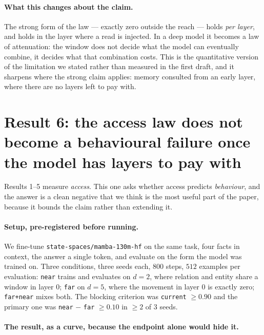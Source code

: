 \documentclass[11pt,a4paper]{article}
\begin{document}
\paragraph{What this changes about the claim.} The strong form of the law --- exactly zero outside
the reach --- holds \emph{per layer}, and holds in the layer where a read is injected. In a deep model
it becomes a law of attenuation: the window does not decide what the model can eventually combine, it
decides what that combination costs. This is the quantitative version of the limitation we stated
rather than measured in the first draft, and it sharpens where the strong claim applies: memory
consulted from an early layer, where there are no layers left to pay with.

\section{Result 6: the access law does not become a behavioural failure once the model has layers to pay with}

Results 1--5 measure \emph{access}. This one asks whether access predicts \emph{behaviour}, and the
answer is a clean negative that we think is the most useful part of the paper, because it bounds the
claim rather than extending it.

\paragraph{Setup, pre-registered before running.} We fine-tune \texttt{state-spaces/mamba-130m-hf} on
the same task, four facts in context, the answer a single token, and evaluate on the form the model
was trained on. Three conditions, three seeds each, $800$ steps, $512$ examples per evaluation:
\texttt{near} trains and evaluates on $d{=}2$, where relation and entity share a window in layer $0$;
\texttt{far} on $d{=}5$, where the movement in layer $0$ is exactly zero; \texttt{far+near} mixes
both. The blocking criterion was \texttt{current} $\ge 0.90$ and the primary one was
\texttt{near} $-$ \texttt{far} $\ge 0.10$ in $\ge 2$ of $3$ seeds.

\paragraph{The result, as a curve, because the endpoint alone would hide it.}
\end{document}
